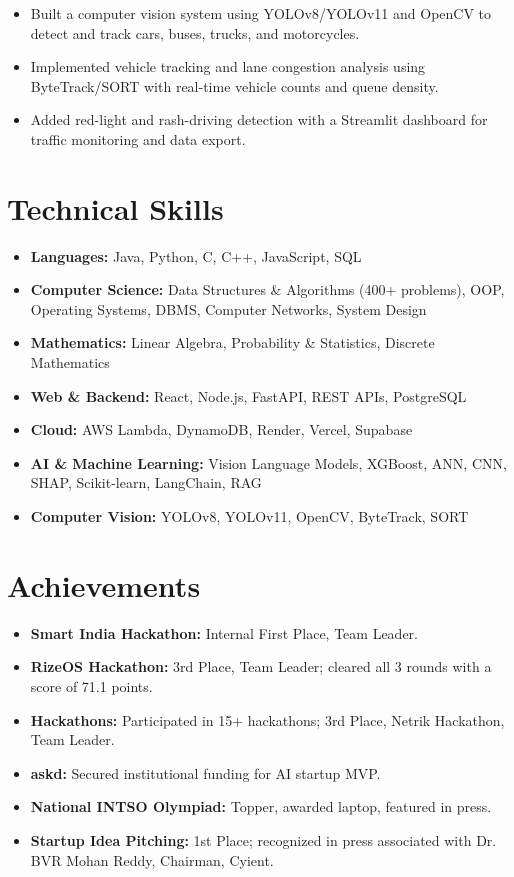 \documentclass[10pt,a4paper]{article}
\begin{document}
\begin{itemize}
    \item Built a computer vision system using YOLOv8/YOLOv11 and OpenCV to detect and track cars, buses, trucks, and motorcycles.
    \item Implemented vehicle tracking and lane congestion analysis using ByteTrack/SORT with real-time vehicle counts and queue density.
    \item Added red-light and rash-driving detection with a Streamlit dashboard for traffic monitoring and data export.
\end{itemize}

\section{Technical Skills}

\begin{itemize}
    \item \textbf{Languages:} Java, Python, C, C++, JavaScript, SQL
    \item \textbf{Computer Science:} Data Structures \& Algorithms (400+ problems), OOP, Operating Systems, DBMS, Computer Networks, System Design
    \item \textbf{Mathematics:} Linear Algebra, Probability \& Statistics, Discrete Mathematics
    \item \textbf{Web \& Backend:} React, Node.js, FastAPI, REST APIs, PostgreSQL
    \item \textbf{Cloud:} AWS Lambda, DynamoDB, Render, Vercel, Supabase
    \item \textbf{AI \& Machine Learning:} Vision Language Models, XGBoost, ANN, CNN, SHAP, Scikit-learn, LangChain, RAG
    \item \textbf{Computer Vision:} YOLOv8, YOLOv11, OpenCV, ByteTrack, SORT
\end{itemize}

\section{Achievements}

\begin{itemize}
    \item \textbf{Smart India Hackathon:} Internal First Place, Team Leader.
    \item \textbf{RizeOS Hackathon:} 3rd Place, Team Leader; cleared all 3 rounds with a score of 71.1 points.
    \item \textbf{Hackathons:} Participated in 15+ hackathons; 3rd Place, Netrik Hackathon, Team Leader.
    \item \textbf{askd:} Secured institutional funding for AI startup MVP.
    \item \textbf{National INTSO Olympiad:} Topper, awarded laptop, featured in press.
    \item \textbf{Startup Idea Pitching:} 1st Place; recognized in press associated with Dr. BVR Mohan Reddy, Chairman, Cyient.
\end{itemize}
\end{document}
